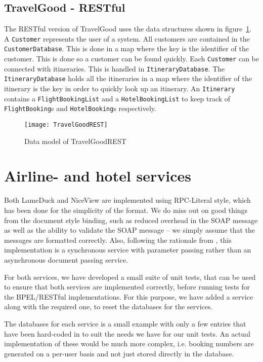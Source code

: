 \subsection{TravelGood - RESTful}
The RESTful version of TravelGood uses the data structures shown in figure~\ref{fig:rest_class}. A \texttt{Customer} represents the user of a system. All customers are contained in the \texttt{CustomerDatabase}. This is done in a map where the key is the identifier of the customer. This is done so a customer can be found quickly. Each \texttt{Customer} can be connected with itineraries. This is handled in \texttt{ItineraryDatabase}. The \texttt{ItineraryDatabase} holds all the itineraries in a map where the identifier of the itinerary is the key in order to quickly look up an itinerary. An \texttt{Itinerary} contains a \texttt{FlightBookingList} and a \texttt{HotelBookingList} to keep track of \texttt{FlightBooking}s and \texttt{HotelBooking}s respectively.


\begin{figure}[H]
\centering
\texttt{[image: TravelGoodREST]}
\caption{Data model of TravelGoodREST}
\label{fig:rest_class}
\end{figure}


\section{Airline- and hotel services}
Both LameDuck and NiceView are implemented using RPC-Literal style, which has been done for the simplicity of the format. We do miss out on good things from the document style binding, such as reduced overhead in the SOAP message as well as the ability to validate the SOAP message -- we simply assume that the messages are formatted correctly. 
Also, following the rationale from \cite{papazoglou2008web}, this implementation is a synchronous service with parameter passing rather than an asynchronous document passing service.

For both services, we have developed a small suite of unit tests, that can be used to ensure that both services are implemented correctly, before running tests for the BPEL/RESTful implementations. For this purpose, we have added a service along with the required one, to reset the databases for the services.

The databases for each service is a small example with only a few entries that have been hard-coded in to suit the needs we have for our unit tests. An actual implementation of these would be much more complex, i.e. booking numbers are generated on a per-user basis and not just stored directly in the database.


